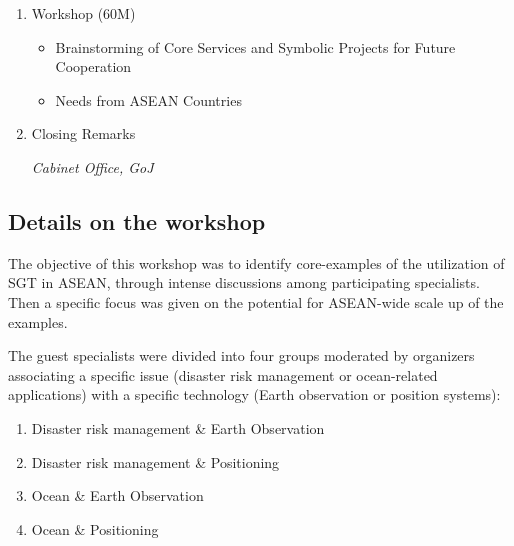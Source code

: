 {\begin{enumerate}
\begin{enumerate}
\begin{enumerate}
		\textit{George Maeda, Kyushu Institute of Technology}
		\item Small Satellite Constellation (7M)
		
		\textit{Yuya Nakamura, AXELSPACE}
		\item Introduction of DIAS and Himawari Data (10M)
		
		\textit{Hiroyuki Miyazaki, The University of Tokyo (on behalf of Prof. Ryosuke Shibasaki)}
		\end{enumerate}

	\end{enumerate}
	
\item Workshop (60M)
	
	\begin{itemize}
	\item Brainstorming of Core Services and Symbolic Projects for Future Cooperation
	\item Needs from ASEAN Countries
	\end{itemize} 

\item Closing Remarks
	
\textit{Cabinet Office, GoJ}

\end{enumerate}
}

\subsection{Details on the workshop}

\tab The objective of this workshop was to identify core-examples of the utilization of SGT in ASEAN, through intense discussions among participating specialists. Then a specific focus was given on the potential for ASEAN-wide scale up of the examples.

\vspace{0.4 cm}

The guest specialists were divided into four groups moderated by organizers associating a specific issue (disaster risk management or ocean-related applications) with a specific technology (Earth observation or position systems):

\begin{enumerate}

\item Disaster risk management \& Earth Observation

\item Disaster risk management \& Positioning

\item Ocean \& Earth Observation

\item Ocean \& Positioning

\end{enumerate}




